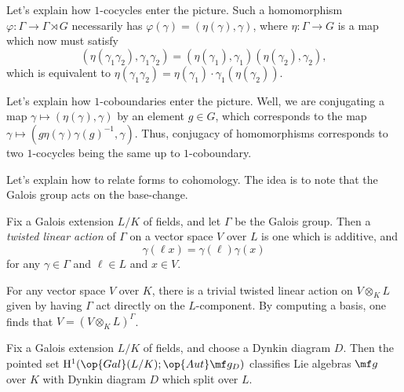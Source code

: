 \documentclass[../notes.tex]{subfiles}
\begin{document}
\begin{remark}
	Let's explain how $1$-cocycles enter the picture. Such a homomorphism $\varphi\colon\Gamma\to\Gamma\rtimes G$ necessarily has $\varphi(\gamma)=(\eta(\gamma),\gamma)$, where $\eta\colon\Gamma\to G$ is a map which now must satisfy
	\[(\eta(\gamma_1\gamma_2),\gamma_1\gamma_2)=(\eta(\gamma_1),\gamma_1)(\eta(\gamma_2),\gamma_2),\]
	which is equivalent to $\eta(\gamma_1\gamma_2)=\eta(\gamma_1)\cdot\gamma_1(\eta(\gamma_2))$.
\end{remark}
\begin{remark}
	Let's explain how $1$-coboundaries enter the picture. Well, we are conjugating a map $\gamma\mapsto(\eta(\gamma),\gamma)$ by an element $g\in G$, which corresponds to the map $\gamma\mapsto\left(g\eta(\gamma)\gamma(g)^{-1},\gamma\right)$. Thus, conjugacy of homomorphisms corresponds to two $1$-cocycles being the same up to $1$-coboundary.
\end{remark}
Let's explain how to relate forms to cohomology. The idea is to note that the Galois group acts on the base-change.
\begin{definition}
	Fix a Galois extension $L/K$ of fields, and let $\Gamma$ be the Galois group. Then a \textit{twisted linear action} of $\Gamma$ on a vector space $V$ over $L$ is one which is additive, and
	\[\gamma(\ell x)=\gamma(\ell)\gamma(x)\]
	for any $\gamma\in\Gamma$ and $\ell\in L$ and $x\in V$.
\end{definition}
\begin{example}
	For any vector space $V$ over $K$, there is a trivial twisted linear action on $V\otimes_KL$ given by having $\Gamma$ act directly on the $L$-component. By computing a basis, one finds that $V=(V\otimes_KL)^\Gamma$.
\end{example}
\begin{proposition} \label{prop:classify-ss-forms}
	Fix a Galois extension $L/K$ of fields, and choose a Dynkin diagram $D$. Then the pointed set $\mathrm H^1(\op{Gal}(L/K);\op{Aut}\mf g_D)$ classifies Lie algebras $\mf g$ over $K$ with Dynkin diagram $D$ which split over $L$.
\end{proposition}
\end{document}
